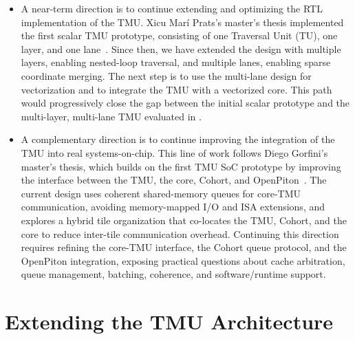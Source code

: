 \begin{itemize}
    \item A near-term direction is to continue extending and optimizing the RTL implementation of the TMU. Xicu Marí Prats's master's thesis implemented the first scalar TMU prototype, consisting of one Traversal Unit (TU), one layer, and one lane~\cite{mariprats2025mastersthesis}. Since then, we have extended the design with multiple layers, enabling nested-loop traversal, and multiple lanes, enabling sparse coordinate merging. The next step is to use the multi-lane design for vectorization and to integrate the TMU with a vectorized core. This path would progressively close the gap between the initial scalar prototype and the multi-layer, multi-lane TMU evaluated in .

    \item A complementary direction is to continue improving the integration of the TMU into real systems-on-chip. This line of work follows Diego Gorfini's master's thesis, which builds on the first TMU SoC prototype by improving the interface between the TMU, the core, Cohort, and OpenPiton~\cite{mariprats2026bscsymposium}. The current design uses coherent shared-memory queues for core-TMU communication, avoiding memory-mapped I/O and ISA extensions, and explores a hybrid tile organization that co-locates the TMU, Cohort, and the core to reduce inter-tile communication overhead. Continuing this direction requires refining the core-TMU interface, the Cohort queue protocol, and the OpenPiton integration, exposing practical questions about cache arbitration, queue management, batching, coherence, and software/runtime support.
\end{itemize}

\section{Extending the TMU Architecture} \label{sec:future-work-extending-tmu}

